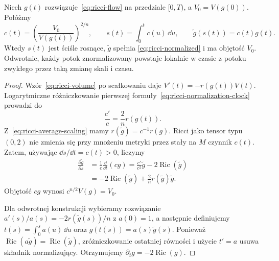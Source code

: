 \begin{twierdzenie}
\label{thm:ricci-normalization-clock}
Niech $g(t)$ rozwiązuje~\eqref{eq:ricci-flow} na przedziale
$[0,T)$, a $V_0=V(g(0))$. Połóżmy
\begin{equation}\label{eq:ricci-normalization-clock}
 c(t)=\left(\frac{V_0}{V(g(t))}\right)^{2/n},
 \qquad s(t)=\int_0^t c(u)\,\dd u,
 \qquad \widetilde g(s(t))=c(t)g(t).
\end{equation}
Wtedy $s(t)$ jest ściśle rosnące, $\widetilde g$ spełnia
\eqref{eq:ricci-normalized} i ma objętość $V_0$.
Odwrotnie, każdy potok znormalizowany powstaje lokalnie
w czasie z potoku zwykłego przez taką zmianę skali i czasu.
\end{twierdzenie}
\begin{proof}
Wzór~\eqref{eq:ricci-volume} po scałkowaniu daje
$V'(t)=-r(g(t))V(t)$. Logarytmiczne różniczkowanie
pierwszej formuły~\eqref{eq:ricci-normalization-clock}
prowadzi do
\begin{equation}\label{eq:ricci-normalization-derivative}
 \frac{c'}c=\frac{2}{n}r(g(t)).
\end{equation}
Z~\eqref{eq:ricci-average-scaling} mamy
$r(\widetilde g)=c^{-1}r(g)$. Ricci jako tensor typu
$(0,2)$ nie zmienia się przy mnożeniu metryki przez
stały na $M$ czynnik $c(t)$. Zatem, używając
$\dd s/\dd t=c(t)>0$, liczymy
\[
 \begin{split}
 \frac{\partial\widetilde g}{\partial s}
 &=\frac1c\frac{\dd}{\dd t}(cg)
   =\frac{c'}{c^2}\widetilde g
      -2\operatorname{Ric}(\widetilde g)\\
 &=-2\operatorname{Ric}(\widetilde g)
    +\frac{2}{n}r(\widetilde g)\widetilde g.
 \end{split}
\]
Objętość $cg$ wynosi $c^{n/2}V(g)=V_0$.

Dla odwrotnej konstrukcji wybieramy rozwiązanie
$a'(s)/a(s)=-2r(\widetilde g(s))/n$ z $a(0)=1$,
a następnie definiujemy $t(s)=\int_0^s a(u)\,\dd u$
oraz $g(t(s))=a(s)\widetilde g(s)$. Ponieważ
$\operatorname{Ric}(a\widetilde g)
=\operatorname{Ric}(\widetilde g)$, zróżniczkowanie
ostatniej równości i użycie $t'=a$ usuwa składnik
normalizujący. Otrzymujemy $\partial_tg=-2\operatorname{Ric}(g)$.
\end{proof}

